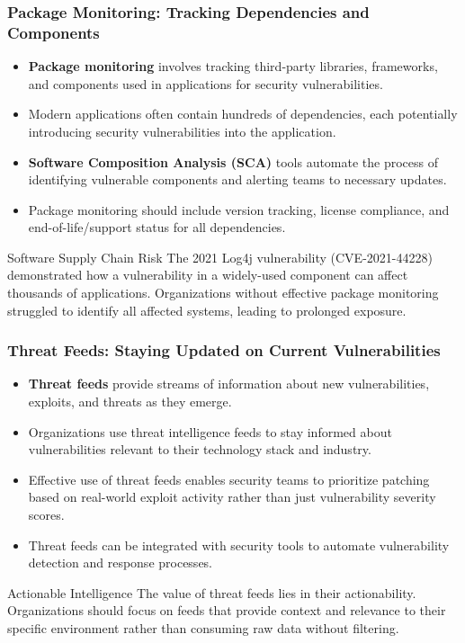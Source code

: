 \documentclass{beamer}
\begin{document}
\begin{frame}
\frametitle{Package Monitoring: Tracking Dependencies and Components}
\begin{itemize}
\item \textbf{Package monitoring} involves tracking third-party libraries, frameworks, and components used in applications for security vulnerabilities.
\item Modern applications often contain hundreds of dependencies, each potentially introducing security vulnerabilities into the application.
\item \textbf{Software Composition Analysis (SCA)} tools automate the process of identifying vulnerable components and alerting teams to necessary updates.
\item Package monitoring should include version tracking, license compliance, and end-of-life/support status for all dependencies.
\end{itemize}

\begin{exampleblock}{Software Supply Chain Risk}
\scriptsize
The 2021 Log4j vulnerability (CVE-2021-44228) demonstrated how a vulnerability in a widely-used component can affect thousands of applications. Organizations without effective package monitoring struggled to identify all affected systems, leading to prolonged exposure.
\end{exampleblock}
\end{frame}

\begin{frame}
\frametitle{Threat Feeds: Staying Updated on Current Vulnerabilities}
\begin{itemize}
\item \textbf{Threat feeds} provide streams of information about new vulnerabilities, exploits, and threats as they emerge.
\item Organizations use threat intelligence feeds to stay informed about vulnerabilities relevant to their technology stack and industry.
\item Effective use of threat feeds enables security teams to prioritize patching based on real-world exploit activity rather than just vulnerability severity scores.
\item Threat feeds can be integrated with security tools to automate vulnerability detection and response processes.
\end{itemize}

\begin{alertblock}{Actionable Intelligence}
\scriptsize
The value of threat feeds lies in their actionability. Organizations should focus on feeds that provide context and relevance to their specific environment rather than consuming raw data without filtering.
\end{alertblock}
\end{frame}
\end{document}
